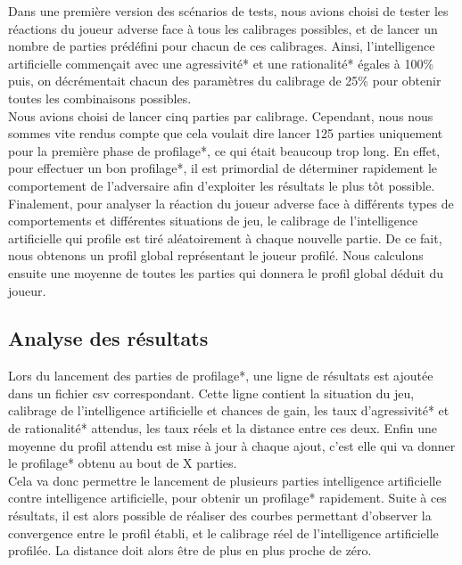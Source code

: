 \documentclass{report}
\begin{document}
Dans une première version des scénarios de tests, nous avions choisi de tester les réactions du joueur adverse face à tous les calibrages possibles, et de lancer un nombre de parties prédéfini pour chacun de ces calibrages. Ainsi, l'intelligence artificielle commençait avec une agressivité* et une rationalité* égales à 100\% puis, on décrémentait chacun des paramètres du calibrage de 25\% pour obtenir toutes les combinaisons possibles.\\

Nous avions choisi de lancer cinq parties par calibrage. Cependant, nous nous sommes vite rendus compte que cela voulait dire lancer 125 parties uniquement pour la première phase de profilage*, ce qui était beaucoup trop long. En effet, pour effectuer un bon profilage*, il est primordial de déterminer rapidement le comportement de l'adversaire afin d'exploiter les résultats le plus tôt possible.\\

Finalement, pour analyser la réaction du joueur adverse face à différents types de comportements et différentes situations de jeu, le calibrage de l'intelligence artificielle qui profile est tiré aléatoirement à chaque nouvelle partie. De ce fait, nous obtenons un profil global représentant le joueur profilé. Nous calculons ensuite une moyenne de toutes les parties qui donnera le profil global déduit du joueur.

\subsection{Analyse des résultats}

\hspace{0.5cm}Lors du lancement des parties de profilage*, une ligne de résultats est ajoutée dans un fichier csv correspondant. Cette ligne contient la situation du jeu, calibrage de l'intelligence artificielle et chances de gain, les taux d'agressivité* et de rationalité* attendus, les taux réels et la distance entre ces deux. Enfin une moyenne du profil attendu est mise à jour à chaque ajout, c'est elle qui va donner le profilage* obtenu au bout de X parties.\\

Cela va donc permettre le lancement de plusieurs parties intelligence artificielle contre intelligence artificielle, pour obtenir un profilage* rapidement. Suite à ces résultats, il est alors possible de réaliser des courbes permettant d'observer la convergence entre le profil établi, et le calibrage réel de l'intelligence artificielle profilée. La distance doit alors être de plus en plus proche de zéro.\\
\end{document}

